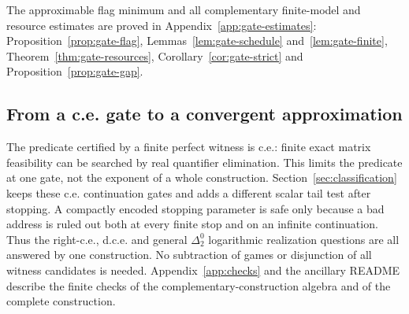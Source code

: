 The approximable flag minimum and all complementary finite-model and resource estimates are proved in Appendix~\ref{app:gate-estimates}: Proposition~\ref{prop:gate-flag}, Lemmas~\ref{lem:gate-schedule} and~\ref{lem:gate-finite}, Theorem~\ref{thm:gate-resources}, Corollary~\ref{cor:gate-strict} and Proposition~\ref{prop:gate-gap}.
\setcounter{theorem}{9}
\setcounter{equation}{15}

\subsection{From a c.e. gate to a convergent approximation}
The predicate certified by a finite perfect witness is c.e.: finite exact matrix feasibility can be searched by real quantifier elimination. This limits the predicate at one gate, not the exponent of a whole construction. Section~\ref{sec:classification} keeps these c.e. continuation gates and adds a different scalar tail test after stopping. A compactly encoded stopping parameter is safe only because a bad address is ruled out both at every finite stop and on an infinite continuation. Thus the right-c.e., d.c.e. and general $\Delta^0_2$ logarithmic realization questions are all answered by one construction. No subtraction of games or disjunction of all witness candidates is needed. Appendix~\ref{app:checks} and the ancillary README describe the finite checks of the complementary-construction algebra and of the complete construction.
